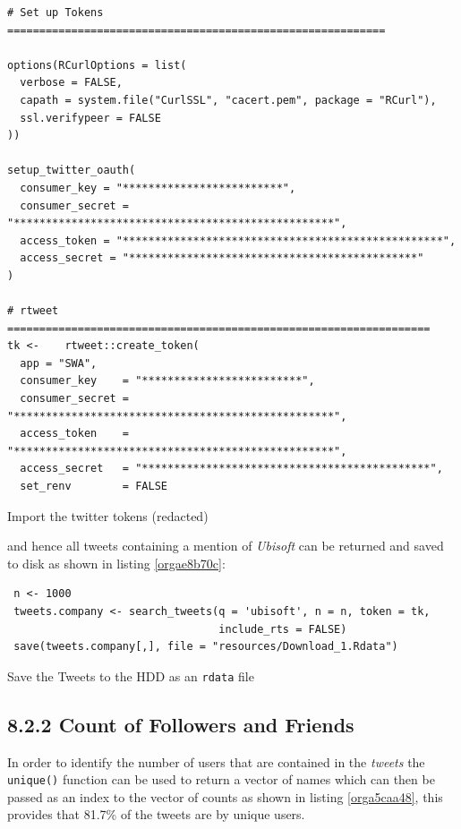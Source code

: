 \documentclass[11pt]{article}
\begin{document}
\begin{listing}[htbp]
\begin{verbatim}
# Set up Tokens ===========================================================

options(RCurlOptions = list(
  verbose = FALSE,
  capath = system.file("CurlSSL", "cacert.pem", package = "RCurl"),
  ssl.verifypeer = FALSE
))

setup_twitter_oauth(
  consumer_key = "*************************",
  consumer_secret = "**************************************************",
  access_token = "**************************************************",
  access_secret = "*********************************************"
)

# rtweet ==================================================================
tk <-    rtweet::create_token(
  app = "SWA",
  consumer_key    = "*************************",
  consumer_secret = "**************************************************",
  access_token    = "**************************************************",
  access_secret   = "*********************************************",
  set_renv        = FALSE
\end{verbatim}
\caption{\label{org89e2677}Import the twitter tokens (redacted)}
\end{listing}

and hence all tweets containing a mention of \emph{Ubisoft} can be returned and saved to disk as shown in listing \ref{orgae8b70c}:

\begin{listing}[htbp]
\begin{verbatim}
 n <- 1000
 tweets.company <- search_tweets(q = 'ubisoft', n = n, token = tk,
                                 include_rts = FALSE)
 save(tweets.company[,], file = "resources/Download_1.Rdata")
\end{verbatim}
\caption{\label{orgae8b70c}Save the Tweets to the HDD as an \texttt{rdata} file}
\end{listing}

\subsection{8.2.2 Count of Followers and Friends}
\label{sec:orgb679a83}
In order to identify the number of users that are contained in the \emph{tweets} the
\texttt{unique()} function can be used to return a vector of names which can then be passed as an index to the vector of counts as shown in listing \ref{orga5caa48}, this provides that 81.7\% of the tweets are by unique users.
\end{document}
